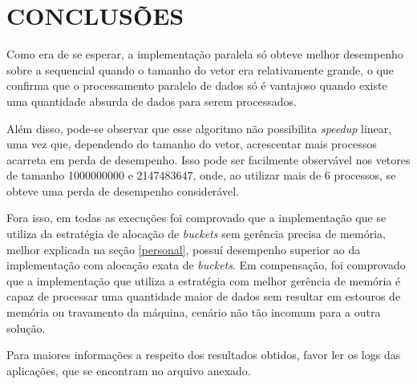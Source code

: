 \section{\normalsize CONCLUSÕES}
	Como era de se esperar, a implementação paralela só obteve melhor desempenho sobre a sequencial quando o tamanho do vetor era relativamente grande, o que confirma que o processamento paralelo de dados só é vantajoso quando existe uma quantidade absurda de dados para serem processados. 
	
	Além disso, pode-se observar que esse algoritmo não possibilita \textit{speedup} linear, uma vez que, dependendo do tamanho do vetor, acrescentar mais processos acarreta em perda de desempenho. Isso pode ser facilmente observável nos vetores de tamanho 1000000000 e 2147483647, onde, ao utilizar mais de 6 processos, se obteve uma perda de desempenho considerável.
	
	Fora isso, em todas as execuções foi comprovado que a implementação que se utiliza da estratégia de alocação de \textit{buckets} sem gerência precisa de memória, melhor explicada na seção \ref{personal}, possuí desempenho superior ao da implementação com alocação exata de \textit{buckets}. Em compensação, foi comprovado que a implementação que utiliza a estratégia com melhor gerência de memória é capaz de processar uma quantidade maior de dados sem resultar em estouros de memória ou travamento da máquina, cenário não tão incomum para a outra solução.
	
	Para maiores informações a respeito dos resultados obtidos, favor ler os logs das aplicações, que se encontram no arquivo anexado.